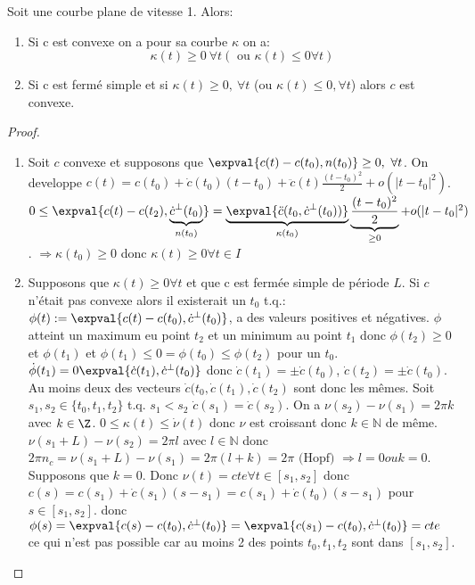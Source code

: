 \begin{theorem}
	Soit une courbe plane de vitesse 1. Alors:
	\begin{enumerate}
		\item Si c est convexe on a pour sa courbe $\kappa$ on a:
		$$\kappa(t)\geq 0\ \forall t (\mbox{ ou } \kappa(t)\leq 0 \forall t)$$
		\item Si c est fermé simple et si $\kappa(t)\geq 0,\ \forall t $ (ou $\kappa(t)\leq 0, \forall t$) alors $c$ est convexe.
	\end{enumerate}
\end{theorem}

\begin{proof}
	\begin{enumerate}
		\item Soit $c$ convexe et supposons que $\expval{c(t)-c(t_0), n(t_0)}\geq 0,\ \forall t$. On developpe $c(t)=c(t_0)+\dot c(t_0)(t-t_0)+\ddot c(t)\frac{(t-t_0)^2}2 + o(|t-t_0|^2)$.
		$0\leq \expval{c(t)-c(t_2), \underbrace{\dot c^\perp(t_0)}_{n(t_0)} }=\underbrace{\expval{\ddot c(t_0, \dot c^\perp(t_0))} }_{\kappa(t_0)}\underbrace{\frac{(t-t_0)^2}2}_{\geq 0}+ o(|t-t_0|^2)$.
		  $\Rightarrow \kappa(t_0)\geq 0$ donc $\kappa(t)\geq 0 \forall t\in I$
		\item Supposons que $\kappa(t)\geq 0\forall t$ et que c est fermée simple de période $L$. Si $c$ n'était pas convexe alors il existerait un $t_0$ t.q.:
			$\phi(t):=\expval{c(t)-c(t_0), \dot c^\perp(t_0)}$, a des valeurs positives et négatives.
	$\phi$ atteint un maximum eu point $t_2$ et un minimum au point $t_1$ donc $\phi(t_2)\geq 0$ et $\phi(t_1)$ et $\phi(t_1)\leq 0=\phi(t_0)\leq\phi(t_2)$ pour un $t_0$. $\dot \phi (t_1)=0\expval{\dot c(t_1), \dot c^\perp(t_0)}$ donc $\dot c (t_1)=\pm \dot c(t_0)$, $\dot c(t_2)=\pm \dot c(t_0)$. Au moins deux des vecteurs $\dot c(t_0, \dot c (t_1), \dot c (t_2)$ sont donc les mêmes. Soit $s_1, s_2 \in \{t_0, t_1, t_2\}$ t.q. $s_1<s_2$ $\dot c(s_1)=\dot c(s_2)$. On a $\nu(s_2)-\nu(s_1)=2\pi k$ avec $k\in\Z$. $0\leq \kappa (t)\leq\dot\nu(t)$ donc $\nu$ est croissant donc $k\in\mathbb{N}$ de même. $\nu(s_1+L)-\nu(s_2)=2\pi l$ avec $l\in\mathbb{N}$ donc $2\pi n_c=\nu(s_1+L)-\nu(s_1)=2\pi (l+k)=2\pi \mbox{ (Hopf) } \Rightarrow l=0 ou k=0$. Supposons que $k=0$.
	Donc $\nu(t)=cte \forall t\in [s_1, s_2]$ donc $c(s)=c(s_1)+\dot c(s_1)(s-s_1)=c(s_1)+\dot c(t_0)(s-s_1)$ pour $s\in[s_1,s_2]$. donc $\phi(s)=\expval{c(s)-c(t_0), \dot c^\perp(t_0)}=\expval{c(s_1)-c(t_0), \dot c^\perp(t_0)}=cte$ ce qui n'est pas possible car au moins 2 des points $t_0, t_1, t_2$ sont dans $[s_1, s_2]$.
	\end{enumerate}
\end{proof}

